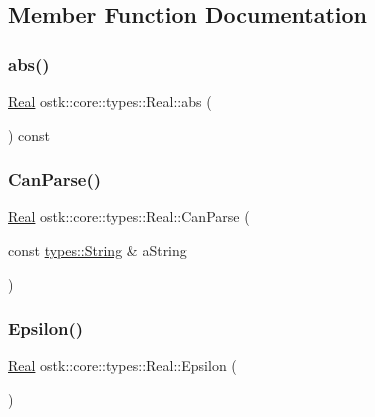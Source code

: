\subsection{Member Function Documentation}
\mbox{\label{classostk_1_1core_1_1types_1_1_real_ac4e980dc4a280db446ccdbfd14375302}} 
\subsubsection{\texorpdfstring{abs()}{abs()}}
{\footnotesize\ttfamily \hyperlink{classostk_1_1core_1_1types_1_1_real}{Real} ostk\+::core\+::types\+::\+Real\+::abs (\begin{DoxyParamCaption}{ }\end{DoxyParamCaption}) const}

\mbox{\label{classostk_1_1core_1_1types_1_1_real_a3c7f5a04ee7f76b45b539382eddbe8a9}} 
\subsubsection{\texorpdfstring{Can\+Parse()}{CanParse()}}
{\footnotesize\ttfamily \hyperlink{classostk_1_1core_1_1types_1_1_real}{Real} ostk\+::core\+::types\+::\+Real\+::\+Can\+Parse (\begin{DoxyParamCaption}\item[{const \hyperlink{classostk_1_1core_1_1types_1_1_string}{types\+::\+String} \&}]{a\+String }\end{DoxyParamCaption})\hspace{0.3cm}{\ttfamily [static]}}

\mbox{\label{classostk_1_1core_1_1types_1_1_real_a90fb5e0984bc7b71a4e4a5651c1933c2}} 
\subsubsection{\texorpdfstring{Epsilon()}{Epsilon()}}
{\footnotesize\ttfamily \hyperlink{classostk_1_1core_1_1types_1_1_real}{Real} ostk\+::core\+::types\+::\+Real\+::\+Epsilon (\begin{DoxyParamCaption}{ }\end{DoxyParamCaption})\hspace{0.3cm}{\ttfamily [static]}}

